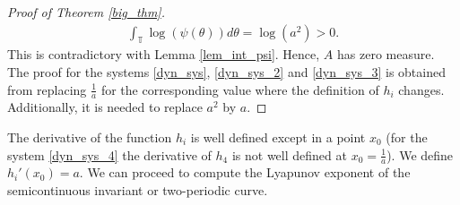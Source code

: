 \documentclass[12pt]{article}
\newcommand{\T}{\mathbb{T}}
\theoremstyle{plain}
\theoremstyle{remark}
\theoremstyle{definition}
\begin{document}
\begin{proof}[Proof of Theorem \ref{big_thm}]
        \begin{align*}
            \int_\T \log(\psi(\theta)) d\theta = \log(a^2) > 0.
        \end{align*}
    This is contradictory with Lemma \ref{lem_int_psi}. Hence, $A$ has zero measure. The proof for the systems \eqref{dyn_sys}, \eqref{dyn_sys_2} and \eqref{dyn_sys_3} is obtained from replacing $\frac{1}{a}$ for the corresponding value where the definition of $h_i$ changes. Additionally, it is needed to replace $a^2$ by $a$.
\end{proof}

The derivative of the function $h_i$ is well defined except in a point $x_0$ (for the system \eqref{dyn_sys_4} the derivative of $h_4$ is not well defined at $x_0=\frac{1}{a}$). We define $h_i'(x_0)=a$.
We can proceed to compute the Lyapunov exponent of the semicontinuous invariant or two-periodic curve.
\end{document}
